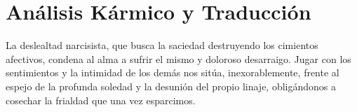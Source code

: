 \section{Análisis Kármico y Traducción}
\begin{figure}
  \vspace{-1.5em}
  \begin{center}
  \end{center}
  \vspace{-1.5em}
\end{figure}
La deslealtad narcisista, que busca la saciedad destruyendo los cimientos afectivos, condena al alma a sufrir el mismo y doloroso desarraigo. Jugar con los sentimientos y la intimidad de los demás nos sitúa, inexorablemente, frente al espejo de la profunda soledad y la desunión del propio linaje, obligándonos a cosechar la frialdad que una vez esparcimos.

